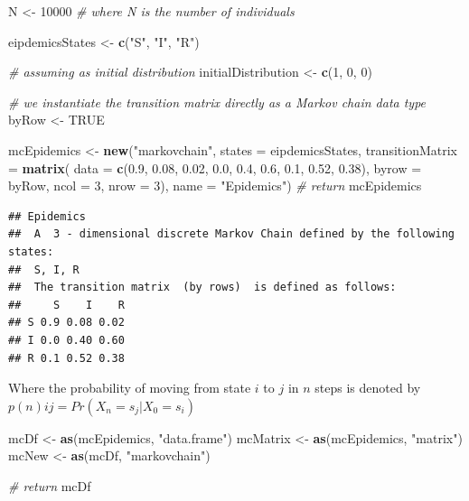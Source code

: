 \documentclass[
]{article}
\newenvironment{Shaded}{\begin{snugshade}}{\end{snugshade}}
\newcommand{\CommentTok}[1]{\textcolor[rgb]{0.56,0.35,0.01}{\textit{#1}}}
\newcommand{\DataTypeTok}[1]{\textcolor[rgb]{0.13,0.29,0.53}{#1}}
\newcommand{\DecValTok}[1]{\textcolor[rgb]{0.00,0.00,0.81}{#1}}
\newcommand{\FloatTok}[1]{\textcolor[rgb]{0.00,0.00,0.81}{#1}}
\newcommand{\KeywordTok}[1]{\textcolor[rgb]{0.13,0.29,0.53}{\textbf{#1}}}
\newcommand{\NormalTok}[1]{#1}
\newcommand{\OtherTok}[1]{\textcolor[rgb]{0.56,0.35,0.01}{#1}}
\newcommand{\StringTok}[1]{\textcolor[rgb]{0.31,0.60,0.02}{#1}}
\begin{document}
\begin{Shaded}
\begin{Highlighting}[]
\NormalTok{N <-}\StringTok{ }\DecValTok{10000} \CommentTok{# where N is the number of individuals}

\NormalTok{eipdemicsStates <-}\StringTok{ }\KeywordTok{c}\NormalTok{(}\StringTok{"S"}\NormalTok{, }\StringTok{"I"}\NormalTok{, }\StringTok{"R"}\NormalTok{)}

\CommentTok{# assuming as initial distribution}
\NormalTok{initialDistribution <-}\StringTok{ }\KeywordTok{c}\NormalTok{(}\DecValTok{1}\NormalTok{, }\DecValTok{0}\NormalTok{, }\DecValTok{0}\NormalTok{) }

\CommentTok{# we instantiate the transition matrix directly as a Markov chain data type}
\NormalTok{byRow <-}\StringTok{ }\OtherTok{TRUE}

\NormalTok{mcEpidemics <-}\StringTok{ }\KeywordTok{new}\NormalTok{(}\StringTok{"markovchain"}\NormalTok{, }
                   \DataTypeTok{states =}\NormalTok{ eipdemicsStates,}
                   \DataTypeTok{transitionMatrix =} \KeywordTok{matrix}\NormalTok{(}
                     \DataTypeTok{data =}  \KeywordTok{c}\NormalTok{(}\FloatTok{0.9}\NormalTok{, }\FloatTok{0.08}\NormalTok{, }\FloatTok{0.02}\NormalTok{,}
                               \FloatTok{0.0}\NormalTok{, }\FloatTok{0.4}\NormalTok{, }\FloatTok{0.6}\NormalTok{,}
                               \FloatTok{0.1}\NormalTok{, }\FloatTok{0.52}\NormalTok{, }\FloatTok{0.38}\NormalTok{),}
                     \DataTypeTok{byrow =}\NormalTok{ byRow,}
                     \DataTypeTok{ncol =} \DecValTok{3}\NormalTok{,}
                     \DataTypeTok{nrow =} \DecValTok{3}\NormalTok{),}
                   \DataTypeTok{name =} \StringTok{"Epidemics"}\NormalTok{)}
\CommentTok{# return}
\NormalTok{mcEpidemics}
\end{Highlighting}
\end{Shaded}

\begin{verbatim}
## Epidemics 
##  A  3 - dimensional discrete Markov Chain defined by the following states: 
##  S, I, R 
##  The transition matrix  (by rows)  is defined as follows: 
##     S    I    R
## S 0.9 0.08 0.02
## I 0.0 0.40 0.60
## R 0.1 0.52 0.38
\end{verbatim}

Where the probability of moving from state \(i\) to \(j\) in \(n\) steps
is denoted by \(p(n)ij = P r (X_n = s_j |X_0 = s_i)\)

\begin{Shaded}
\begin{Highlighting}[]
\NormalTok{mcDf <-}\StringTok{ }\KeywordTok{as}\NormalTok{(mcEpidemics, }\StringTok{"data.frame"}\NormalTok{)}
\NormalTok{mcMatrix <-}\StringTok{ }\KeywordTok{as}\NormalTok{(mcEpidemics, }\StringTok{"matrix"}\NormalTok{)}
\NormalTok{mcNew <-}\StringTok{ }\KeywordTok{as}\NormalTok{(mcDf, }\StringTok{"markovchain"}\NormalTok{)}

\CommentTok{# return}
\NormalTok{mcDf}
\end{Highlighting}
\end{Shaded}
\end{document}
